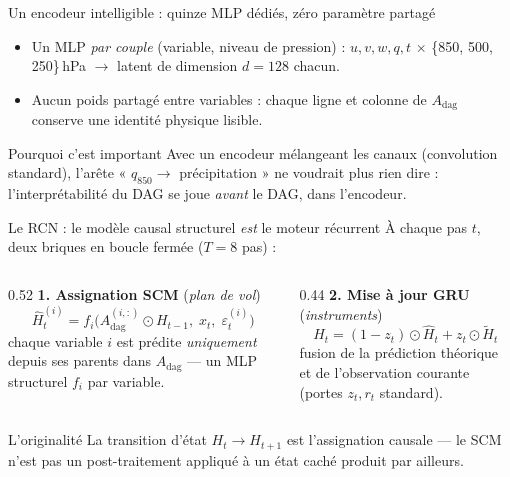 \documentclass[aspectratio=169,10pt]{beamer}
\newcommand{\Adag}{A_{\mathrm{dag}}}
\begin{document}
\begin{frame}{Un encodeur intelligible : quinze MLP dédiés, zéro paramètre partagé}
  \begin{itemize}
    \item Un MLP \emph{par couple} (variable, niveau de pression) : $u, v, w, q, t$
          $\times$ \{850, 500, 250\}\,hPa $\to$ latent de dimension $d = 128$ chacun.
    \item Aucun poids partagé entre variables : chaque ligne et colonne de $\Adag$
          conserve une \alert{identité physique} lisible.
  \end{itemize}
  \vspace{0.2cm}
  \begin{block}{Pourquoi c'est important}
    \small Avec un encodeur mélangeant les canaux (convolution standard), l'arête
    « $q_{850} \to$ précipitation » ne voudrait plus rien dire : l'interprétabilité
    du DAG se joue \emph{avant} le DAG, dans l'encodeur.
  \end{block}
\end{frame}

\begin{frame}{Le RCN : le modèle causal structurel \emph{est} le moteur récurrent}
  À chaque pas $t$, deux briques en boucle fermée ($T = 8$ pas) :
  \begin{columns}[T]
    \begin{column}{0.52\textwidth}
      \textbf{1. Assignation SCM} (\emph{plan de vol})
      \begin{equation*}
        \hat{H}_t^{(i)} = f_i\!\big( \Adag^{(i,:)} \odot H_{t-1},\; x_t,\; \varepsilon_t^{(i)} \big)
      \end{equation*}
      {\small chaque variable $i$ est prédite \emph{uniquement} depuis ses parents dans
      $\Adag$ --- un MLP structurel $f_i$ par variable.}
    \end{column}
    \begin{column}{0.44\textwidth}
      \textbf{2. Mise à jour GRU} (\emph{instruments})
      \begin{equation*}
        H_t = (1 - z_t) \odot \hat{H}_t + z_t \odot \tilde{H}_t
      \end{equation*}
      {\small fusion de la prédiction théorique et de l'observation courante
      (portes $z_t, r_t$ standard).}
    \end{column}
  \end{columns}
  \vspace{0.3cm}
  \begin{block}{L'originalité}
    \small La transition d'état $H_{t} \to H_{t+1}$ \alert{est} l'assignation causale ---
    le SCM n'est pas un post-traitement appliqué à un état caché produit par ailleurs.
  \end{block}
\end{frame}
\end{document}
